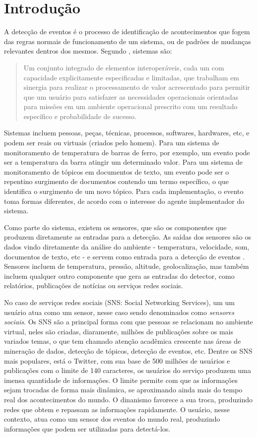 \chapter{Introdução}

A detecção de eventos é o processo de identificação de acontecimentos que fogem das regras normais de funcionamento de um sistema, ou de padrões de mudanças relevantes dentros dos mesmos. Segundo , sistemas são:

\begin{quote}
	Um conjunto integrado de elementos interoperáveis, cada um com capacidade explicitamente especificadas e limitadas, que trabalham em sinergia para realizar o processamento de valor acrescentado para permitir que um usuário para satisfazer as necessidades operacionais orientadas para missões em um ambiente operacional prescrito com um resultado específico e probabilidade de sucesso.
\end{quote}

Sistemas incluem pessoas, peças, técnicas, processos, softwares, hardwares, etc, e podem ser reais ou virtuais (criados pelo homem). Para um sistema de monitoramento de temperatura de barras de ferro, por exemplo, um evento pode ser a temperatura da barra atingir um determinado valor. Para um sistema de monitoramento de tópicos em documentos de texto, um evento pode ser o repentino surgimento de documentos contendo um termo específico, o que identifica o surgimento de um novo tópico. Para cada implementação, o evento toma formas diferentes, de acordo com o interesse do agente implementador do sistema.

Como parte do sistema, existem os sensores, que são os componentes que produzem diretamente as entradas para a detecção. As saídas dos sensores são os dados vindo diretamente da análise do ambiente - temperatura, velocidade, som, documentos de texto, etc - e servem como entrada para a detecção de eventos . Sensores incluem de temperatura, pressão, altitude, geolocalização, mas também incluem qualquer outro componente que gera as entradas do detector, como relatórios, publicações de notícias ou serviços redes sociais. 

No caso de serviços redes sociais (SNS: Social Networking Services), um um usuário atua como um sensor, nesse caso sendo denominados como \textit{sensores sociais}. Os SNS são a principal forma com que pessoas se relacionam no ambiente virtual, neles são criadas, diaramente, milhões de publicações sobre os mais variados temas, o que tem chamado atenção acadêmica crescente nas áreas de mineração de dados, detecção de tópicos, detecção de eventos, etc. Dentre os SNS mais populares, está o Twitter, com sua base de 500 milhões de usuários e publicações com o limite de 140 caracteres, os usuários do serviço produzem uma imensa quantidade de informações. O limite permite com que as informações sejam trocadas de forma mais dinâmica, se aproximando ainda mais do tempo real dos acontecimentos do mundo. O dinanismo favorece a sua troca, produzindo redes que obtem e repassam as informações rapidamente. O usuário, nesse contexto, atua como um sensor dos eventos do mundo real, produzindo informações que podem ser utilizadas para detectá-los.

